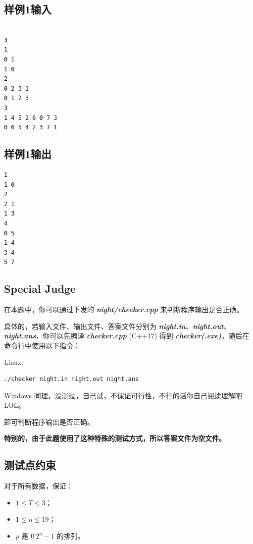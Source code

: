 \documentclass[12pt]{article}
\newcommand{\filename}[1]{{\textbf{\textit{#1}}}}
\begin{document}
\subsection{样例1输入}

\begin{lstlisting}

3
1
0 1
1 0
2
0 2 3 1
0 1 2 3
3
1 4 5 2 6 0 7 3
0 6 5 4 2 3 7 1

\end{lstlisting}

\subsection{样例1输出}

\begin{lstlisting}
1
1 0
2
2 1
1 3
4
0 5
1 4
3 4
5 7

\end{lstlisting}

\subsection{Special Judge}

在本题中，你可以通过下发的 \filename{night/checker.cpp} 来判断程序输出是否正确。

具体的，若输入文件、输出文件、答案文件分别为 \filename{night.in}、\filename{night.out}、\filename{night.ans}，你可以先编译 \filename{checker.cpp} (C++17) 得到 \filename{checker(.exe)}，随后在命令行中使用以下指令：

Linux:
\begin{verbatim}
./checker night.in night.out night.ans
\end{verbatim}

Windows 同理，没测过，自己试，不保证可行性，不行的话你自己阅读理解吧LOL。

即可判断程序输出是否正确。

\textbf{特别的，由于此题使用了这种特殊的测试方式，所以答案文件为空文件。}

\subsection{测试点约束}

对于所有数据，保证：

\begin{itemize}
    \item $1\le T\le 3$；
    \item $1\le n\le 19$；
    \item $p$ 是 $0~2^n-1$ 的排列。
\end{itemize}
\end{document}
